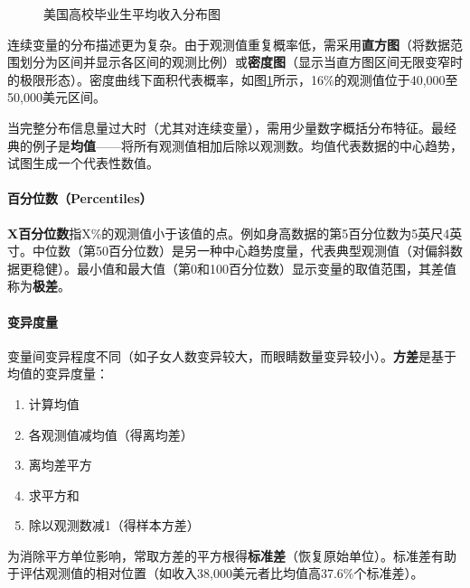 \begin{figure}[ht]
	\centering
	\caption{美国高校毕业生平均收入分布图}
	\label{fig:earnings}
\end{figure}


连续变量的分布描述更为复杂。由于观测值重复概率低，需采用\textbf{直方图}（将数据范围划分为区间并显示各区间的观测比例）或\textbf{密度图}（显示当直方图区间无限变窄时的极限形态）。密度曲线下面积代表概率，如图\ref{fig:earnings}所示，16\%的观测值位于40,000至50,000美元区间。

当完整分布信息量过大时（尤其对连续变量），需用少量数字概括分布特征。最经典的例子是\textbf{均值}——将所有观测值相加后除以观测数。均值代表数据的中心趋势，试图生成一个代表性数值。

\paragraph*{百分位数（Percentiles）}
\textbf{X百分位数}指X\%的观测值小于该值的点。例如身高数据的第5百分位数为5英尺4英寸。中位数（第50百分位数）是另一种中心趋势度量，代表典型观测值（对偏斜数据更稳健）。最小值和最大值（第0和100百分位数）显示变量的取值范围，其差值称为\textbf{极差}。

\paragraph*{变异度量}
变量间变异程度不同（如子女人数变异较大，而眼睛数量变异较小）。\textbf{方差}是基于均值的变异度量：
\begin{enumerate}
	\item 计算均值
	\item 各观测值减均值（得离均差）
	\item 离均差平方
	\item 求平方和
	\item 除以观测数减1（得样本方差）
\end{enumerate}

为消除平方单位影响，常取方差的平方根得\textbf{标准差}（恢复原始单位）。标准差有助于评估观测值的相对位置（如收入38,000美元者比均值高37.6\%个标准差）。


